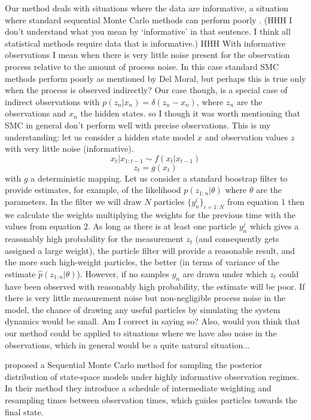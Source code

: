 Our method deals with situations where the data are informative, a situation where standard sequential Monte Carlo methods can perform poorly {\color{blue}\cite{Del Moral}}. {\color{red} (HHH I don't understand what you mean by `informative' in that sentence. I think all statistical methods require data that is informative.)}
{\color{blue}HHH With informative observations I mean when there is very little noise present for the observation process relative to the amount of process noise. In this case standard SMC methods perform poorly as mentioned by Del Moral, but perhaps this is true only when the process is observed indirectly? Our case though, is a special case of indirect observations with $p(z_n | x_n) = \delta (z_n - x_n)$, where $z_n$ are the observations and $x_n$ the hidden states. so I though it was worth mentioning that SMC in general don't perform well with precise observations. This is my understanding: let us consider a hidden state model $x$ and observation values $z$ with very little noise (informative). 
\begin{equation}
    x_t | x_{1:t-1} \sim f(x_t | x_{t-1})
\end{equation}
\begin{equation}
    z_t = g(x_t)
\end{equation}
with $g$ a deterministic mapping. Let us consider a standard boostrap filter to provide estimates, for example, of the likelihood $p(z_{1:n} | \theta)$ where $\theta$ are the parameters. In the filter we will draw $N$ particles $\{ y^i_n\}_{i=1:N}$ from equation 1 then we calculate the weights multiplying the weights for the previous time with the values from equation 2. As long as there is at least one particle $y^j_n$ which gives a reasonably high probability for the measurement $z_t$ (and consequently gets assigned a large weight), the particle filter will provide a reasonable result, and the more such high-weight particles, the better (in terms of variance of the estimate $\hat{p}(z_{1:n} | \theta)$). However, if no samples $y_n$ are drawn under which $z_t$ could have been observed with reasonably high probability, the estimate will be poor. If there is very little measurement noise but non-negligible process noise in the model, the chance of drawing any useful particles by simulating the system dynamics would be small. Am I correct in saying so? Also, would you think that our method could be applied to situations where we have also noise in the observations, which in general would be a quite natural situation...}

\cite{Del Moral} proposed a Sequential Monte Carlo method for sampling the posterior distribution of state-space models under highly informative observation regimes. In their method they introduce a schedule of intermediate weighting and resampling times between observation times, which guides particles towards the final state.

